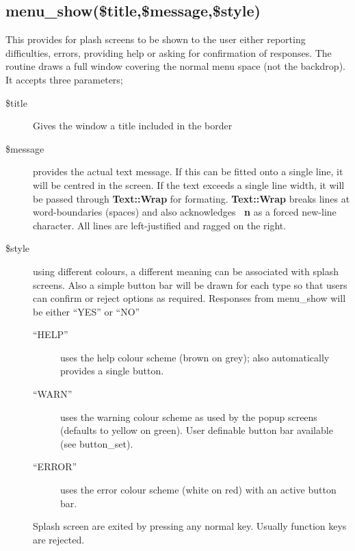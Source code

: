 \documentclass[a4paper,abstracton]{article}
\begin{document}
\subsection{menu\_show(\$title,\$message,\$style)} 
This provides for plash screens to be shown to the user either reporting difficulties, errors, providing help or asking for confirmation of responses. The routine draws a full window covering the normal menu space (not the backdrop). It accepts three parameters;
\begin{description}
\item [\$title] Gives the window a title included in the border
\item [\$message] provides the actual text message. If this can be fitted onto a single line, it will be centred in the screen. If the text exceeds a single line width, it will be passed through \textbf{Text::Wrap} for formating. \textbf{Text::Wrap} breaks lines at word-boundaries (spaces) and also acknowledges \textbf{\ n} as a forced new-line character. All lines are left-justified and ragged on the right.
\item [\$style] using different colours, a different meaning can be associated with splash screens. Also a simple button bar will be drawn for each type so that users can confirm or reject options as required. Responses from menu\_show will be either ``YES'' or ``NO''
\begin{description}
\item [``HELP''] uses the help colour scheme (brown on grey); also automatically provides a single button.
\item [``WARN''] uses the warning colour scheme as used by the popup screens (defaults to yellow on green). User definable button bar available (see button\_set).
\item [``ERROR''] uses the error colour scheme (white on red) with an active button bar.
\end{description}
Splash screen are exited by pressing any normal key. Usually function keys are rejected.
\end{description}
\end{document}
